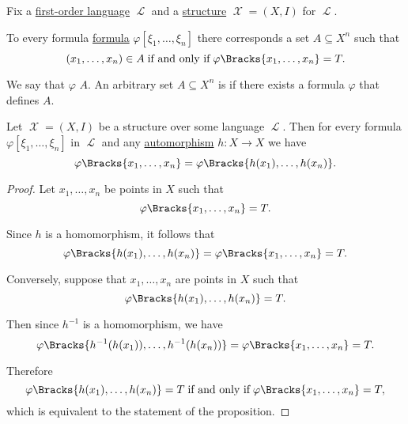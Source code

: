 \begin{definition}\label{def:first_order_definability}
  Fix a \hyperref[def:first_order_syntax]{first-order language} \( \mscrL \) and a \hyperref[def:first_order_structure]{structure} \( \mscrX = (X, I) \) for \( \mscrL \).

  To every formula \hyperref[def:first_order_syntax]{formula} \( \varphi[\xi_1, \ldots, \xi_n] \) there corresponds a set \( A \subseteq X^n \) such that
  \begin{equation*}
    (x_1, \ldots, x_n) \in A \T{if and only if} \varphi\Bracks{x_1, \ldots, x_n} = T.
  \end{equation*}

  We say that \( \varphi \)  \( A \). An arbitrary set \( A \subseteq X^n \) is  if there exists a formula \( \varphi \) that defines \( A \).
\end{definition}

\begin{proposition}\label{thm:automorphism_preserves_validity}
  Let \( \mscrX = (X, I) \) be a structure over some language \( \mscrL \). Then for every formula \( \varphi[\xi_1, \ldots, \xi_n] \) in \( \mscrL \) and any \hyperref[def:first_order_homomorphism_invertibility/automorphism]{automorphism} \( h: X \to X \) we have
  \begin{equation*}
    \varphi\Bracks{x_1, \ldots, x_n} = \varphi\Bracks{h(x_1), \ldots, h(x_n)}.
  \end{equation*}
\end{proposition}
\begin{proof}
  Let \( x_1, \ldots, x_n \) be points in \( X \) such that
  \begin{equation*}
    \varphi\Bracks{x_1, \ldots, x_n} = T.
  \end{equation*}

  Since \( h \) is a homomorphism, it follows that
  \begin{equation*}
    \varphi\Bracks{h(x_1), \ldots, h(x_n)} = \varphi\Bracks{x_1, \ldots, x_n} = T.
  \end{equation*}

  Conversely, suppose that \( x_1, \ldots, x_n \) are points in \( X \) such that
  \begin{equation*}
    \varphi\Bracks{h(x_1), \ldots, h(x_n)} = T.
  \end{equation*}

  Then since \( h^{-1} \) is a homomorphism, we have
  \begin{equation*}
    \varphi\Bracks{h^{-1}(h(x_1)), \ldots, h^{-1}(h(x_n))}
    =
    \varphi\Bracks{x_1, \ldots, x_n}
    =
    T.
  \end{equation*}

  Therefore
  \begin{equation*}
    \varphi\Bracks{h(x_1), \ldots, h(x_n)} = T \T{if and only if} \varphi\Bracks{x_1, \ldots, x_n} = T,
  \end{equation*}
  which is equivalent to the statement of the proposition.
\end{proof}

